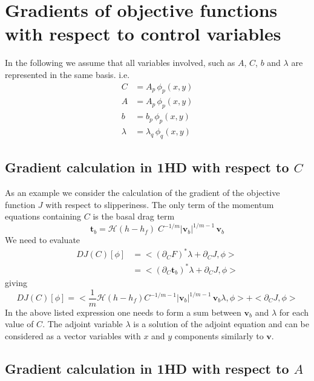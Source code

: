 \documentclass[10pt,a4paper]{book}
\newcommand{\He}{\mathcal{H}}
\newcommand{\p}{\partial}
\begin{document}
\section{Gradients of objective functions with respect to control variables}



In the following we assume that all variables involved, such as $A$, $C$, $b$ and $\lambda$ are represented in the same basis. i.e.
\begin{align*}
          C & = A_p \, \phi_p(x,y) \\ 
          A & = A_p \, \phi_p(x,y) \\ 
          b & = b_p \, \phi_p(x,y) \\ 
    \lambda & =\lambda_q \, \phi_q(x,y)
\end{align*}



\subsection{Gradient calculation in 1HD with respect to $C$}

As an example we consider the calculation of the gradient of the
objective function $J$ with respect to slipperiness. The only term of
the momentum equations containing $C$ is the basal drag term
\[
\bm{t}_b   = \He(h-h_f) \; C^{-1/m} | \bm{v}_b|^{1/m-1} \, \bm{v}_b 
\]
We need to evaluate 
\begin{align*}
 D J(C)[\phi] &= < (\p_C F)^\ast \lambda  + \p_C J ,  \phi >  \\
              &= < (\p_C \bm{t}_b)^\ast \lambda  + \p_C J ,  \phi > 
\end{align*}
giving
\[
D J(C)[\phi]=< \frac{1}{m} \He(h-h_f) C^{-1/m-1} | \bm{v}_b|^{1/m-1} \, \bm{v}_b   \lambda  , \phi > +  < \p_C J ,  \phi > 
\]
In the above listed expression one needs to form a sum between
$\bm{v}_b$ and $\lambda$ for each value of $C$. The adjoint variable
$\lambda$ is a solution of the adjoint equation and can be considered
as a vector variables with $x$ and $y$ components similarly to
$\bm{v}$.

\subsection{Gradient calculation in 1HD with respect to $A$}
\end{document}
